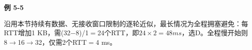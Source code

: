 {\color{ink}\bfseries 例 5-5}\par\vspace{1bp}沿用本节持续有数据、无接收窗口限制的逐轮近似，最长情况为全程拥塞避免：每RTT增加1 KB，需(32\(-\)8)/\allowbreak{}1\(=\allowbreak{}\)24个RTT，即\(24\times 2=\allowbreak{}48 ms\)，选D。全程慢开始则8\(\to \)16\(\to \)32，仅需2个RTT\(=\allowbreak{}\)4 ms。
